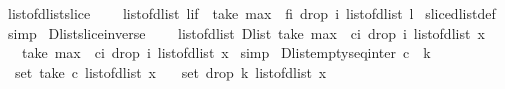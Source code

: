 \begin{isabellebody}
\isanewline
{}\isamarkupfalse%
\ list{\isacharunderscore}of{\isacharunderscore}dlist{\isacharunderscore}slice\ {\isacharcolon}\ \isanewline
\ \ {\isachardoublequoteopen}list{\isacharunderscore}of{\isacharunderscore}dlist\ {\isacharparenleft}l{\isasymdagger}i{\isachardot}{\isachardot}f{\isacharparenright}\ {\isacharequal}\ take\ {\isacharparenleft}max\ {}\ {\isacharparenleft}f{\isacharminus}i{\isacharparenright}{\isacharparenright}\ {\isacharparenleft}drop\ i\ {\isacharparenleft}list{\isacharunderscore}of{\isacharunderscore}dlist\ l{\isacharparenright}{\isacharparenright}{\isachardoublequoteclose}\isanewline
%
\isadelimproof
%
\endisadelimproof
%
\isatagproof
{}\isamarkupfalse%
\ slice{\isacharunderscore}dlist{\isacharunderscore}def\ \isanewline
{}\isamarkupfalse%
\ simp%
\endisatagproof
{\isafoldproof}%
%
\isadelimproof
\isanewline
%
\endisadelimproof
\isanewline
{}\isamarkupfalse%
\ Dlist{\isacharunderscore}slice{\isacharunderscore}inverse\ {\isacharcolon}\ \isanewline
\ \ {\isachardoublequoteopen}list{\isacharunderscore}of{\isacharunderscore}dlist\ {\isacharparenleft}Dlist\ {\isacharparenleft}take\ {\isacharparenleft}max\ {}\ {\isacharparenleft}c{\isacharminus}i{\isacharparenright}{\isacharparenright}\ {\isacharparenleft}drop\ i\ {\isacharparenleft}list{\isacharunderscore}of{\isacharunderscore}dlist\ x{\isacharparenright}{\isacharparenright}{\isacharparenright}{\isacharparenright}\ \isanewline
\ \ {\isacharequal}\ {\isacharparenleft}take\ {\isacharparenleft}max\ {}\ {\isacharparenleft}c{\isacharminus}i{\isacharparenright}{\isacharparenright}\ {\isacharparenleft}drop\ i\ {\isacharparenleft}list{\isacharunderscore}of{\isacharunderscore}dlist\ x{\isacharparenright}{\isacharparenright}{\isacharparenright}{\isachardoublequoteclose}\isanewline
%
\isadelimproof
%
\endisadelimproof
%
\isatagproof
{}\isamarkupfalse%
\ simp%
\endisatagproof
{\isafoldproof}%
%
\isadelimproof
\isanewline
%
\endisadelimproof
\isanewline
{}\isamarkupfalse%
\ Dlist{\isacharunderscore}empty{\isacharunderscore}seq{\isacharunderscore}inter{\isacharcolon}\ {\isachardoublequoteopen}c\ {\isasymle}\ k\ {\isasymLongrightarrow}\ \isanewline
\ \ {\isacharparenleft}\isanewline
\ \ set\ {\isacharparenleft}take\ c\ {\isacharparenleft}list{\isacharunderscore}of{\isacharunderscore}dlist\ x{\isacharparenright}{\isacharparenright}\ {\isasyminter}\isanewline
\ \ set\ {\isacharparenleft}drop\ k\ {\isacharparenleft}list{\isacharunderscore}of{\isacharunderscore}dlist\ x{\isacharparenright}{\isacharparenright}\isanewline

\end{isabellebody}
